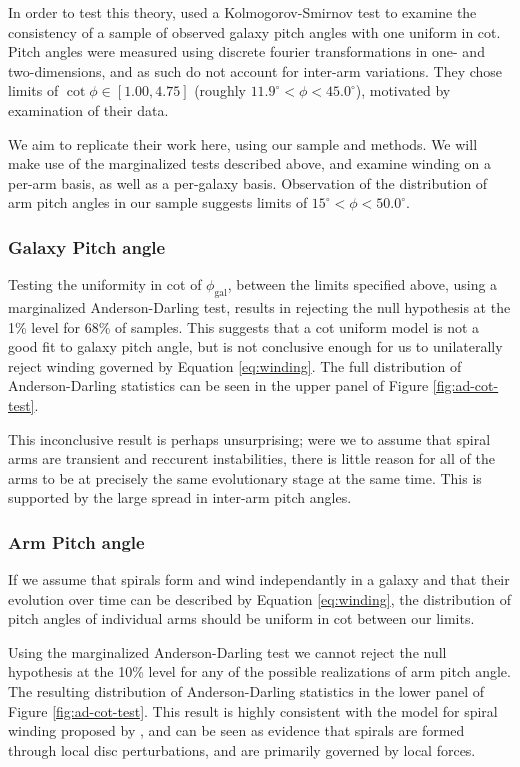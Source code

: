 In order to test this theory, \citet{2019arXiv190910291P} used a Kolmogorov-Smirnov test to examine the consistency of a sample of observed galaxy pitch angles with one uniform in cot. Pitch angles were measured using discrete fourier transformations in one- and two-dimensions, and as such do not account for inter-arm variations. They chose limits of $\cot{\phi} \in [1.00, 4.75]$ (roughly $11.9^\circ < \phi < 45.0^\circ$), motivated by examination of their data.

We aim to replicate their work here, using our sample and methods. We will make use of the marginalized tests described above, and examine winding on a per-arm basis, as well as a per-galaxy basis. Observation of the distribution of arm pitch angles in our sample suggests limits of $15^\circ < \phi < 50.0^\circ$.

\subsubsection{Galaxy Pitch angle}

Testing the uniformity in cot of $\phi_\mathrm{gal}$, between the limits specified above, using a marginalized Anderson-Darling test, results in rejecting the null hypothesis at the 1\% level for 68\% of samples. This suggests that a cot uniform model is not a good fit to galaxy pitch angle, but is not conclusive enough for us to unilaterally reject winding governed by Equation \ref{eq:winding}. The full distribution of Anderson-Darling statistics can be seen in the upper panel of Figure \ref{fig:ad-cot-test}.

This inconclusive result is perhaps unsurprising; were we to assume that spiral arms are transient and reccurent instabilities, there is little reason for all of the arms to be at precisely the same evolutionary stage at the same time. This is supported by the large spread in inter-arm pitch angles.


\subsubsection{Arm Pitch angle}
If we assume that spirals form and wind independantly in a galaxy and that their evolution over time can be described by Equation \ref{eq:winding}, the distribution of pitch angles of individual arms should be uniform in cot between our limits.

Using the marginalized Anderson-Darling test we cannot reject the null hypothesis at the 10\% level for any of the possible realizations of arm pitch angle. The resulting distribution of Anderson-Darling statistics in the lower panel of Figure \ref{fig:ad-cot-test}. This result is highly consistent with the model for spiral winding proposed by \citet{2019arXiv190910291P}, and can be seen as evidence that spirals are formed through local disc perturbations, and are primarily governed by local forces.

